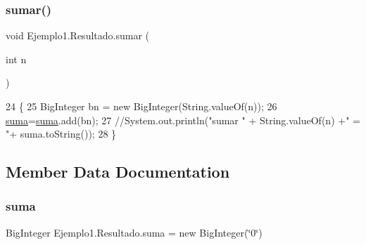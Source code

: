 \subsubsection{\texorpdfstring{sumar()}{sumar()}}
{\footnotesize\ttfamily void Ejemplo1.\+Resultado.\+sumar (\begin{DoxyParamCaption}\item[{int}]{n }\end{DoxyParamCaption})\hspace{0.3cm}{\ttfamily [inline]}}


\begin{DoxyCode}
24     \{
25         BigInteger bn = \textcolor{keyword}{new} BigInteger(String.valueOf(n));
26         \mbox{\hyperlink{namespacesuma}{suma}}=\mbox{\hyperlink{namespacesuma}{suma}}.add(bn);
27         \textcolor{comment}{//System.out.println("sumar " + String.valueOf(n) +" = "+ suma.toString());}
28     \}
\end{DoxyCode}


\subsection{Member Data Documentation}
\mbox{\label{class_ejemplo1_1_1_resultado_a2e9f85dff43e5d9db41f8a05219d83fd}} 
\subsubsection{\texorpdfstring{suma}{suma}}
{\footnotesize\ttfamily Big\+Integer Ejemplo1.\+Resultado.\+suma = new Big\+Integer(\char`\"{}0\char`\"{})\hspace{0.3cm}{\ttfamily [private]}}

